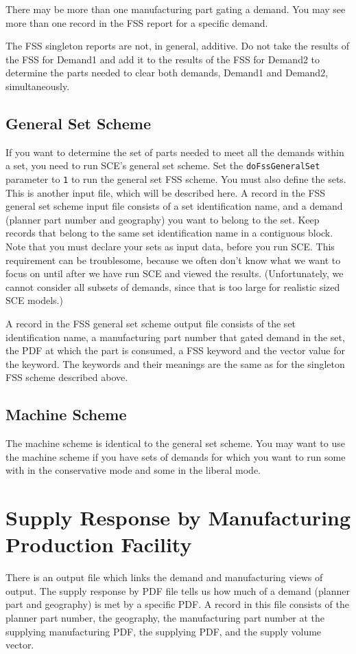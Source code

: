 There may be more than one manufacturing part gating a demand.  You
may see more than one record in the FSS report for a specific demand.

The FSS singleton reports are not, in general, additive.  Do not take
the results of the FSS for Demand1 and add it to the results of the
FSS for Demand2 to determine the parts needed to clear both demands,
Demand1 and Demand2, simultaneously.

\subsection{General Set Scheme}
If you want to determine the set of parts needed to meet all the
demands within a set, you need to run SCE's general set scheme.  Set
the {\tt doFssGeneralSet} parameter to {\tt 1} to run the general set FSS
scheme.  You must also define the sets.  This is another input file,
which will be described here.  A record in the FSS general set scheme
input file consists of a set identification name, and a demand
(planner part number and geography) you want to belong to the set.
Keep records that belong to the same set identification name in a
contiguous block.  Note that you must declare your sets as input data,
before you run SCE.  This requirement can be troublesome, because we
often don't know what we want to focus on until after we have run SCE
and viewed the results.  (Unfortunately, we cannot consider all
subsets of demands, since that is too large for realistic sized SCE
models.)



A record in the FSS general set scheme output file consists of the set
identification name, a manufacturing part number that gated demand in
the set, the PDF at which the part is consumed, a FSS keyword and the
vector value for the keyword.  The keywords and their meanings are the
same as for the singleton FSS scheme described above.

\subsection{Machine Scheme}
The machine scheme is identical to the general set scheme.  You may
want to use the machine scheme if you have sets of demands for which
you want to run some with in the conservative mode and some in the
liberal mode.

\section{Supply Response by Manufacturing Production Facility}
There is an output file which links the demand and manufacturing views
of output.  The supply response by PDF file tells us how much of a
demand (planner part and geography) is met by a specific PDF.  A
record in this file consists of the planner part number, the
geography, the manufacturing part number at the supplying
manufacturing PDF, the supplying PDF, and the supply volume vector.

